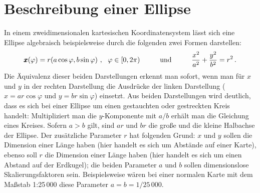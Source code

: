 \section{Beschreibung einer Ellipse} 

In einem zweidimensionalen kartesischen
Koordinatensystem l\"asst sich eine Ellipse algebraisch beispielsweise durch die folgenden
zwei Formen darstellen:
\begin{equation}
\label{eq_Ellipse1}
            \pmb{x}(\varphi) = r (a \cos \varphi, b \sin \varphi) ~,~~  \varphi \in [0,2\pi)
            \hspace{1cm} {\rm und} \hspace{1cm}
             \frac{x^2}{a^2} + \frac{y^2}{b^2} = r^2 \, .
\end{equation}
Die \"Aquivalenz dieser beiden Darstellungen erkennt man sofort, wenn man f\"ur $x$ und $y$ in
der rechten Darstellung die Ausdr\"ucke der linken Darstellung ($x=ar\cos \varphi$ und $y=br\sin \varphi$)
einsetzt. Aus beiden Darstellungen wird deutlich, dass es sich bei einer Ellipse um einen
gestauchten oder gestreckten Kreis handelt: Multipliziert man die $y$-Komponente mit $a/b$ erh\"alt
man die Gleichung eines Kreises. Sofern $a>b$ gilt, sind $ar$ und $br$ die gro\ss e und die kleine 
Halbachse der Ellipse. Der zus\"atzliche Parameter $r$ hat folgenden Grund:
$x$ und $y$ sollen die Dimension einer L\"ange haben (hier handelt es sich um Abst\"ande auf
einer Karte), ebenso soll $r$ die Dimension einer L\"ange haben (hier handelt es sich um einen
Abstand auf der Erdkugel); die beiden Parameter $a$ und $b$ sollen dimensionslose
Skalierungsfaktoren sein. Beispielsweise w\"aren bei einer normalen Karte mit dem
Ma\ss stab 1:25\,000 diese Parameter $a=b=1/25\,000$. 

